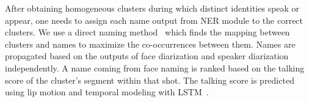 After obtaining homogeneous clusters during which distinct identities speak or appear, one needs to assign each name output from NER module to the correct clusters. 
%
%
We use a direct naming method~\cite{poignant2012fusion} which finds the mapping between clusters and names to maximize the co-occurrences between them.
%
Names are propagated based on the outputs of face diarization and speaker diarization independently. 
%
%
A name coming from face naming is ranked based on the talking score of the cluster's segment within that shot.
%
The talking score is predicted using lip motion and temporal modeling with LSTM~\cite{Le_ACMMM_2016}.

\endinput
